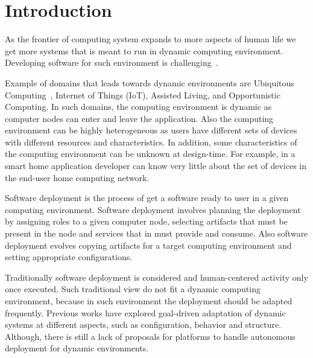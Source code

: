\section{Introduction}
As the frontier of computing system expands to more aspects of human life we get more systems that is meant to run in dynamic computing environment. Developing software for such environment is challenging~\cite{baresi_toward_2006}.

Example of domains that leads towards dynamic environments are Ubiquitous Computing~\cite{bell_yesterdays_2007}, Internet of Things (IoT)\cite{atzori_internet_2010}, Assisted Living\cite{kleinberger_ambient_2007}, and Opportunistic Computing\cite{smaldone_improving_2011}. In such domains, the computing environment is dynamic as computer nodes can enter and leave the application. Also the computing environment can be highly heterogeneous as users have different sets of devices with different resources and characteristics. In addition, some characteristics of the computing environment can be unknown at design-time. For example, in a smart home application developer can know very little about the set of devices in the end-user home computing network.

Software deployment is the process of get a software ready to user in a given computing environment. Software deployment involves planning the deployment by assigning roles to a given computer node, selecting artifacts that must be present in the node and services that in must provide and consume. Also software deployment evolves copying artifacts for a target computing environment and setting appropriate configurations.

Traditionally software deployment is considered and human-centered activity only once executed. Such traditional view do not fit a dynamic computing environment, because in such environment the deployment should be adapted frequently. Previous works have explored goal-driven adaptation of dynamic systems at different aspects, such as configuration, behavior and structure\cite{yu_goals_2008}. Although, there is still a lack of proposals for platforms to handle autonomous deployment for dynamic environments.



